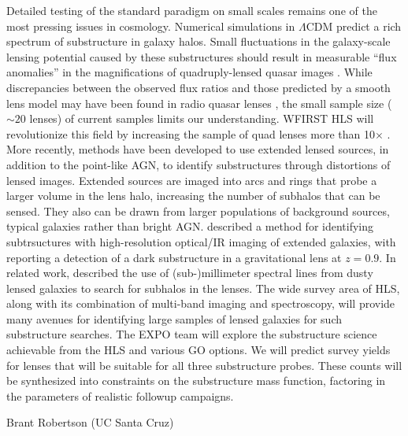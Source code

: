 \documentclass[11pt]{article}
\begin{document}
Detailed testing of the standard paradigm on small scales remains one of the most pressing issues
in cosmology. Numerical simulations in $\Lambda$CDM predict a rich spectrum of substructure in galaxy
halos. Small fluctuations in the galaxy-scale lensing potential caused by these substructures
should result in measurable “flux anomalies” in the magnifications of quadruply-lensed quasar
images \citep{metcalf2001a}. While discrepancies between the observed flux ratios and
those predicted by a smooth lens model may have been found in radio quasar lenses \citep{mao1998a,dalal2002a,metcalf2002a}, the small sample size ($\sim20$
lenses) of current samples limits our understanding. WFIRST HLS will revolutionize this field
by increasing the sample of quad lenses more than 10$\times$ \citep{oguri2010a}.
More recently, methods have been developed to use extended lensed sources, in addition to the
point-like AGN, to identify substructures through distortions of lensed images. Extended sources
are imaged into arcs and rings that probe a larger volume in the lens halo, increasing the number
of subhalos that can be sensed. They also can be drawn from larger populations of background
sources, typical galaxies rather than bright AGN. \citet{vegetti2009a} described a
method for identifying subtrsuctures with high-resolution optical/IR imaging of extended
galaxies, with \citet{vegetti2012a} reporting a detection of a dark substructure in a gravitational
lens at $z=0.9$. In related work, \citet{hezaveh2013a} described the use of (sub-)millimeter
spectral lines from dusty lensed galaxies to search for subhalos in the lenses. The wide survey
area of HLS, along with its combination of multi-band imaging and spectroscopy, will provide
many avenues for identifying large samples of lensed galaxies for such substructure searches.
The EXPO team will explore the substructure science achievable from the HLS and various GO
options. We will predict survey yields for lenses that will be suitable for all three substructure
probes. These counts will be synthesized into constraints on the substructure mass function,
factoring in the parameters of realistic followup campaigns.
\clearpage

\noindent %


\def\apj{\it{ApJ}}                  
\def\apjl{\it{ApJL}}
\def\mnras{\it{MNRAS}}
\def\nat{\it{Nature}}




\vspace{4in}


Brant Robertson (UC Santa Cruz)
\end{document}
